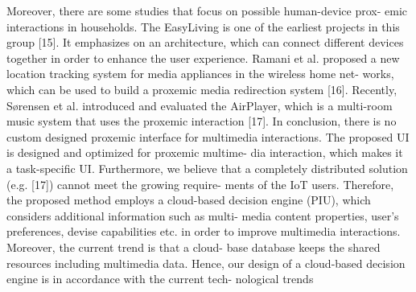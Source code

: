 \documentclass[runningheads,a4paper]{llncs}
\begin{document}
\newline
Moreover, there are some studies that focus on possible human-device prox- emic interactions in households. The EasyLiving is one of the earliest projects in this group [15]. It emphasizes on an architecture, which can connect different devices together in order to enhance the user experience. Ramani et al. proposed a new location tracking system for media appliances in the wireless home net- works, which can be used to build a proxemic media redirection system [16]. Recently, Sørensen et al. introduced and evaluated the AirPlayer, which is a multi-room music system that uses the proxemic interaction [17]. \newline
In conclusion, there is no custom designed proxemic interface for multimedia interactions. The proposed UI is designed and optimized for proxemic multime- dia interaction, which makes it a task-specific UI. Furthermore, we believe that a completely distributed solution (e.g. [17]) cannot meet the growing require- ments of the IoT users. Therefore, the proposed method employs a cloud-based decision engine (PIU), which considers additional information such as multi- media content properties, user’s preferences, devise capabilities etc. in order to improve multimedia interactions. Moreover, the current trend is that a cloud- base database keeps the shared resources including multimedia data. Hence, our design of a cloud-based decision engine is in accordance with the current tech- nological trends
\end{document}
